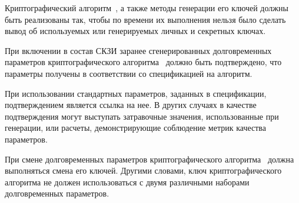 \label{R.CS.Timing} %
Криптографический алгоритм~,
а также методы генерации его ключей должны быть реализованы так,
чтобы по времени их выполнения нельзя было сделать вывод об
используемых или генерируемых личных и секретных ключах.

\label{R.CS.ValPar} %
При включении в состав СКЗИ заранее сгенерированных долговременных параметров 
криптографического алгоритма~ должно быть подтверждено, 
что параметры получены в соответствии со спецификацией на алгоритм.

\begin{note*}
При использовании стандартных параметров, заданных в спецификации,
подтверждением является ссылка на нее.
%
В других случаях в качестве подтверждения могут выступать затравочные значения,
использованные при генерации, или расчеты, демонстрирующие соблюдение метрик
качества параметров.
\end{note*}

\label{R.CS.ChangePar} %
При смене долговременных параметров криптографического
алгоритма~ должна выполняться смена его ключей. Другими
словами, ключ криптографического алгоритма не должен использоваться с двумя
различными наборами долговременных параметров.

